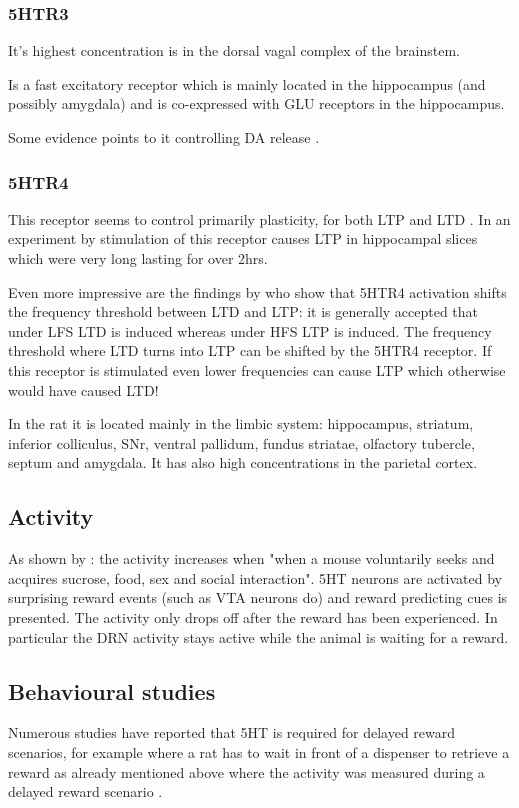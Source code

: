 \documentclass[12pt,a4paper]{article}
\begin{document}
\subsubsection{5HTR3}
It's highest concentration is in the dorsal vagal complex of the brainstem. 

Is a fast excitatory receptor which is mainly located in the
hippocampus (and possibly amygdala) \citep{Palacios1990} and is
co-expressed with GLU receptors in the hippocampus.

Some evidence points to it controlling DA release \citep{Mengod2010}.

\subsubsection{5HTR4}
This receptor seems to control primarily plasticity, for both LTP and
LTD \citep{Penas-Cazorla2015}. In an experiment by \citep{Mlinar2006}
stimulation of this receptor causes LTP in hippocampal slices which
were very long lasting for over 2hrs.

Even more impressive are the findings by \citep{Hagena2017} who show
that 5HTR4 activation shifts the frequency threshold between LTD and
LTP: it is generally accepted that under LFS LTD is induced whereas
under HFS LTP is induced. The frequency threshold where LTD turns into
LTP can be shifted by the 5HTR4 receptor. If this receptor is
stimulated even lower frequencies can cause LTP which otherwise would
have caused LTD!

In the rat it is located mainly in the limbic system: hippocampus,
striatum, inferior colliculus, SNr, ventral pallidum, fundus striatae,
olfactory tubercle, septum and amygdala. It has also high
concentrations in the parietal cortex.




\subsection{Activity}
As shown by \citep{Li2016}: the activity increases when "when a mouse
voluntarily seeks and acquires sucrose, food, sex and social
interaction". 5HT neurons are activated by surprising reward events
(such as VTA neurons do) and reward predicting cues is presented. The
activity only drops off after the reward has been experienced. In
particular the DRN activity stays active while the animal is waiting
for a reward.

\subsection{Behavioural studies}
Numerous studies have reported that 5HT is required for delayed reward
scenarios, for example where a rat has to wait in front of a dispenser
to retrieve a reward \citep{Khani2016} as already mentioned above
where the activity was measured during a delayed reward scenario
\citep{Li2016}.
\end{document}
